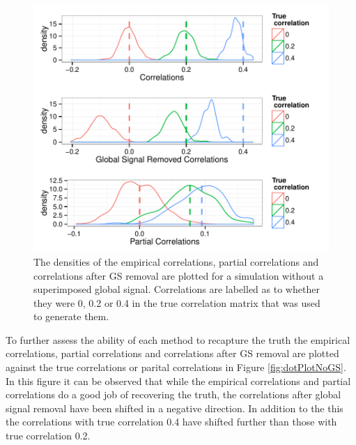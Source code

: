 \documentclass[a4paper]{article}\usepackage[]{graphicx}\usepackage[]{color}
\makeatletter
\def\maxwidth{ %
  \ifdim\Gin@nat@width>\linewidth
    \linewidth
  \else
    \Gin@nat@width
  \fi
}
\newenvironment{kframe}{%
 \def\at@end@of@kframe{}%
 \ifinner\ifhmode%
  \def\at@end@of@kframe{\end{minipage}}%
  \begin{minipage}{\columnwidth}%
 \fi\fi%
 \def\FrameCommand##1{\hskip\@totalleftmargin \hskip-\fboxsep
 \colorbox{shadecolor}{##1}\hskip-\fboxsep
     \hskip-\linewidth \hskip-\@totalleftmargin \hskip\columnwidth}%
 \MakeFramed {\advance\hsize-\width
   \@totalleftmargin\z@ \linewidth\hsize
   \@setminipage}}%
 {\par\unskip\endMakeFramed%
 \at@end@of@kframe}
\newenvironment{knitrout}{}{} %
\makeatother
\begin{document}
\begin{knitrout}
\color{fgcolor}\begin{kframe}


{\ttfamily\noindent\itshape\color{messagecolor}{\#\# Loading required package: grid}}\end{kframe}\begin{figure}[]


{\centering \includegraphics[width=\maxwidth]{GSFigs/GSDensityNoGS} 

}

\caption[The densities of the empirical correlations, partial correlations and correlations after GS removal are plotted for a simulation without a superimposed global signal]{The densities of the empirical correlations, partial correlations and correlations after GS removal are plotted for a simulation without a superimposed global signal. Correlations are labelled as to whether they were 0, 0.2 or 0.4 in the true correlation matrix that was used to generate them.\label{fig:DensityNoGS}}
\end{figure}


\end{knitrout}


To further assess the ability of each method to recapture the truth the empirical correlations, partial correlations and correlations after GS removal are plotted against the true correlations or parital correlations in Figure \ref{fig:dotPlotNoGS}.  In this figure it can be observed that while the empirical correlations and partial correlations do a good job of recovering the truth, the correlations after global signal removal have been shifted in a negative direction. In addition to the this the correlations with true correlation 0.4 have shifted further than those with true correlation 0.2.
\end{document}
